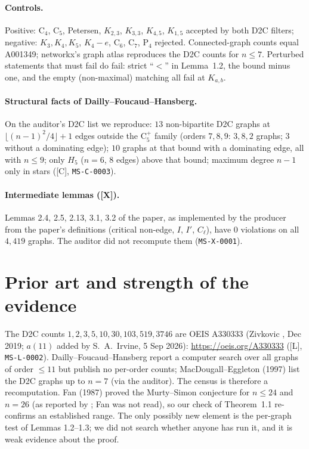 \documentclass[10pt]{article}
\newcommand{\tier}[1]{\textsf{[#1]}}
\newcommand{\tL}{\tier{L}}
\newcommand{\tC}{\tier{C}}
\newcommand{\tX}{\tier{X}}
\begin{document}
\paragraph{Controls.} Positive: C$_4$, C$_5$, Petersen, $K_{2,3}$, $K_{3,3}$, $K_{4,5}$, $K_{1,5}$ accepted by both D2C filters; negative: $K_3,K_4,K_5$, $K_4{-}e$, C$_6$, C$_7$, P$_4$ rejected. Connected-graph counts equal A001349; networkx's graph atlas reproduces the D2C counts for $n\le7$. Perturbed statements that must fail do fail: strict ``$<$'' in Lemma~1.2, the bound minus one, and the empty (non-maximal) matching all fail at $K_{a,b}$.

\paragraph{Structural facts of Dailly--Foucaud--Hansberg.} On the auditor's D2C list we reproduce: $13$ non-bipartite D2C graphs at $\lfloor (n-1)^2/4\rfloor+1$ edges outside the C$_5^+$ family (orders $7,8,9$: $3,8,2$ graphs; $3$ without a dominating edge); $10$ graphs at that bound with a dominating edge, all with $n\le9$; only $H_5$ ($n=6$, $8$ edges) above that bound; maximum degree $n-1$ only in stars (\tC{}, \texttt{MS-C-0003}).

\paragraph{Intermediate lemmas (\tX{}).} Lemmas 2.4, 2.5, 2.13, 3.1, 3.2 of the paper, as implemented by the producer from the paper's definitions (critical non-edge, $I$, $I'$, $C_\ell$), have $0$ violations on all $4{,}419$ graphs. The auditor did not recompute them (\texttt{MS-X-0001}).

\section{Prior art and strength of the evidence}\label{sec:lit}
The D2C counts $1,2,3,5,10,30,103,519,3746$ are OEIS A330333 (Zivkovic \cite{oeis}, Dec 2019; $a(11)$ added by S.~A.~Irvine, 5 Sep 2026): \url{https://oeis.org/A330333} (\tL{}, \texttt{MS-L-0002}). Dailly--Foucaud--Hansberg \cite{dfh} report a computer search over all graphs of order $\le11$ but publish no per-order counts; MacDougall--Eggleton (1997) list the D2C graphs up to $n=7$ (via the auditor). The census is therefore a recomputation. Fan (1987) proved the Murty--Simon conjecture for $n\le24$ and $n=26$ (as reported by \cite{dfh}; Fan was not read), so our check of Theorem~1.1 re-confirms an established range. The only possibly new element is the per-graph test of Lemmas 1.2--1.3; we did not search whether anyone has run it, and it is weak evidence about the proof.
\end{document}
